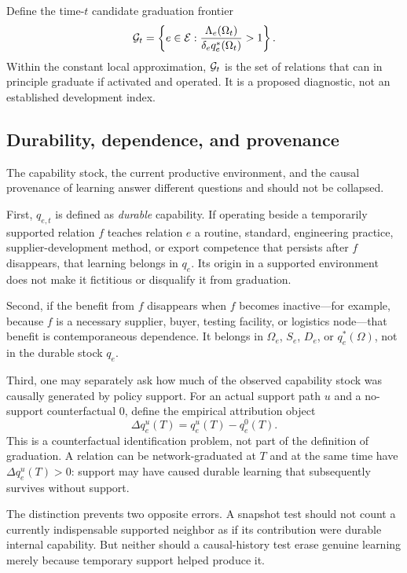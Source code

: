 Define the time-$t$ candidate graduation frontier
\begin{equation}
\mathcal{G}_t
=
\left\{
 e\in\mathcal{E}:
\frac{\Lambda_e(\Omega_t)}{\delta_e q_e^*(\Omega_t)}>1
\right\}.
\label{eq:frontier}
\end{equation}
Within the constant local approximation, $\mathcal{G}_t$ is the set of relations that can in principle graduate if activated and operated. It is a proposed diagnostic, not an established development index.

\subsection{Durability, dependence, and provenance}
\label{subsec:provenance}

The capability stock, the current productive environment, and the causal provenance of learning answer different questions and should not be collapsed.

First, $q_{e,t}$ is defined as \emph{durable} capability. If operating beside a temporarily supported relation $f$ teaches relation $e$ a routine, standard, engineering practice, supplier-development method, or export competence that persists after $f$ disappears, that learning belongs in $q_e$. Its origin in a supported environment does not make it fictitious or disqualify it from graduation.

Second, if the benefit from $f$ disappears when $f$ becomes inactive---for example, because $f$ is a necessary supplier, buyer, testing facility, or logistics node---that benefit is contemporaneous dependence. It belongs in $\Omega_e$, $S_e$, $D_e$, or $q_e^*(\Omega)$, not in the durable stock $q_e$.

Third, one may separately ask how much of the observed capability stock was causally generated by policy support. For an actual support path $u$ and a no-support counterfactual $0$, define the empirical attribution object
\begin{equation}
\Delta q_e^{u}(T)
=
q_e^{u}(T)-q_e^{0}(T).
\label{eq:provenance}
\end{equation}
This is a counterfactual identification problem, not part of the definition of graduation. A relation can be network-graduated at $T$ and at the same time have $\Delta q_e^u(T)>0$: support may have caused durable learning that subsequently survives without support.

The distinction prevents two opposite errors. A snapshot test should not count a currently indispensable supported neighbor as if its contribution were durable internal capability. But neither should a causal-history test erase genuine learning merely because temporary support helped produce it.

